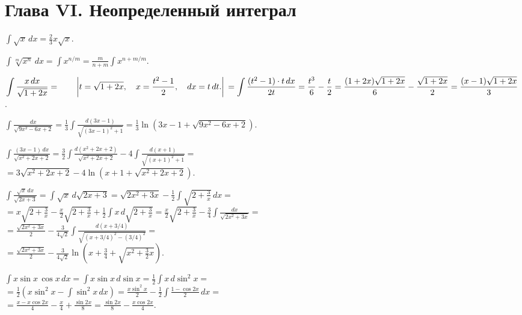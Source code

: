 \documentclass[a5paper,10pt]{article}
\begin{document}

\bigskip
\section* {Глава VI. Неопределенный интеграл}

\medskip
\noindent

\medskip
{} $\displaystyle\int\sqrt x\,dx=\frac23x\sqrt x.$

\medskip
{} $\displaystyle\int\sqrt[m]{x^n}\,dx=\int x^{n/m}=
\frac{m}{n+m}\int x^{{n+m}/m}.$

\medskip
{} $\displaystyle\int\frac{x\,dx}{\sqrt{1+2x}}=
\qquad\left|t=\sqrt{1+2x},\quad x=
\frac{t^2-1}{2},\quad dx=t\,dt.\right|\\
=\int\frac{(t^2-1)\cdot t\,dx}{2t}=\frac{t^3}{6}-\frac t2=
\frac{(1+2x)\sqrt{1+2x}}{6}-\frac{\sqrt{1+2x}}{2}=
\frac{(x-1)\sqrt{1+2x}}{3}$.

\medskip
{} $\displaystyle\int\frac{dx}{\sqrt{9x^2-6x+2}}=
\frac13\int\frac{d(3x-1)}{\sqrt{(3x-1)^2+1}}=\frac13\ln(3x-1+\sqrt{9x^2-6x+2})$.

\medskip
{} $\displaystyle\int\frac{(3x-1)\,dx}{\sqrt{x^2+2x+2}}=
\frac32\int\frac{d(x^2+2x+2)}{\sqrt{x^2+2x+2}}-
4\int\frac{d(x+1)}{\sqrt{(x+1)^2+1}}=$\\
$\displaystyle =3\sqrt{x^2+2x+2}-4\ln(x+1+\sqrt{x^2+2x+2})$.

\medskip
{} $\displaystyle\int\frac{\sqrt x\,dx}{\sqrt{2x+3}}=\int\sqrt x\,d\sqrt{2x+3}=
\sqrt{2x^2+3x}-\frac12\int\sqrt{2+\frac3x}\,dx=$\\
$\displaystyle =x\sqrt{2+\frac3x}-\frac x2\sqrt{2+\frac3x}+\frac12\int x\,d\sqrt{2+\frac3x}=
\frac x2\sqrt{2+\frac3x}-\frac34\int \frac{dx}{\sqrt{2x^2+3x}}=$\\
$\displaystyle =\frac{\sqrt{2x^2+3x}}{2}-
\frac{3}{4\sqrt2}\int\frac{d(x+3/4)}{\sqrt{(x+3/4)^2-(3/4)^2}}=$\\
$\displaystyle =\frac{\sqrt{2x^2+3x}}{2}-
\frac{3}{4\sqrt2}\ln\left(x+\frac34+\sqrt{x^2+\frac32x}\right)$.

\medskip
{} $\displaystyle\int x\sin x\,\cos x\,dx=
\int x\sin x\,d\sin x=\frac12\int x\,d\sin^2 x=$\\
$\displaystyle =\frac12\left(x\sin^2 x-\int\sin^2 x\,dx\right)=
\frac{x\sin^2 x}{2}-\frac12\int\frac{1-\cos 2 x}{2}\,dx=$\\
$\displaystyle =\frac{x-x\cos2x}{4}-\frac x4+\frac{\sin2x}{8}=
\frac{\sin2x}{8}-\frac{x\cos2x}{4}$.
\end{document}
